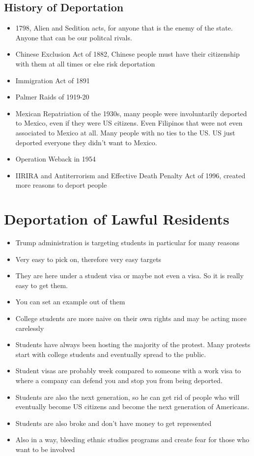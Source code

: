 \documentclass{article}
\begin{document}
\subsection{History of Deportation}
\begin{itemize}
  \item 1798, Alien and Sedition acts, for anyone that is the enemy of the state.
    Anyone that can be our politcal rivals.
  \item Chinese Exclusion Act of 1882, Chinese people must have their citizenship
    with them at all times or else risk deportation
  \item Immigration Act of 1891
  \item Palmer Raids of 1919-20
  \item Mexican Repatriation of the 1930s, many people were involuntarily deported
    to Mexico, even if they were US citizens. Even Filipinos that were not even
    associated to Mexico at all. Many people with no ties to the US. US just deported
    everyone they didn't want to Mexico.
  \item Operation Weback in 1954
  \item IIRIRA and Antiterrorism and Effective Death Penalty Act of 1996,
    created more reasons to deport people
\end{itemize}

\section*{Deportation of Lawful Residents}
\begin{itemize}
  \item Trump administration is targeting students in particular for many reasons
  \item Very easy to pick on, therefore very easy targets
  \item They are here under a student visa or maybe not even a visa. So it is really
    easy to get them.
  \item You can set an example out of them
  \item College students are more naive on their own rights and may
    be acting more carelessly
  \item Students have always been hosting the majority of the protest.
    Many protests start with college students and eventually spread to
    the public.
  \item Student visas are probably week compared to someone with a work visa
    to where a company can defend you and stop you from being deported.
  \item Students are also the next generation, so he can get rid of
    people who will eventually become US citizens and become the next generation
    of Americans.
  \item Students are also broke and don't have money to get represented
  \item Also in a way, bleeding ethnic studies programs and create fear for those
    who want to be involved
\end{itemize}
\end{document}
